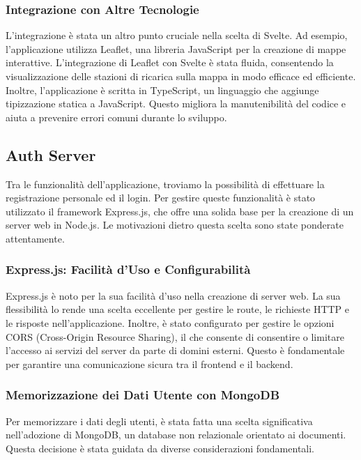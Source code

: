 \subsubsection{Integrazione con Altre Tecnologie}

L'integrazione è stata un altro punto cruciale nella scelta di Svelte. Ad esempio, l'applicazione utilizza Leaflet, una libreria JavaScript per la creazione di mappe interattive. L'integrazione di Leaflet con Svelte è stata fluida, consentendo la visualizzazione delle stazioni di ricarica sulla mappa in modo efficace ed efficiente. Inoltre, l'applicazione è scritta in TypeScript, un linguaggio che aggiunge tipizzazione statica a JavaScript. Questo migliora la manutenibilità del codice e aiuta a prevenire errori comuni durante lo sviluppo.

\subsection{Auth Server}

Tra le funzionalità dell'applicazione, troviamo la possibilità di effettuare la registrazione personale ed il login. Per gestire queste funzionalità è stato utilizzato il framework Express.js, che offre una solida base per la creazione di un server web in Node.js. Le motivazioni dietro questa scelta sono state ponderate attentamente.

\subsubsection{Express.js: Facilità d'Uso e Configurabilità}

Express.js è noto per la sua facilità d'uso nella creazione di server web. La sua flessibilità lo rende una scelta eccellente per gestire le route, le richieste HTTP e le risposte nell'applicazione. Inoltre, è stato configurato per gestire le opzioni CORS (Cross-Origin Resource Sharing), il che consente di consentire o limitare l'accesso ai servizi del server da parte di domini esterni. Questo è fondamentale per garantire una comunicazione sicura tra il frontend e il backend.

\subsubsection{Memorizzazione dei Dati Utente con MongoDB}

Per memorizzare i dati degli utenti, è stata fatta una scelta significativa nell'adozione di MongoDB, un database non relazionale orientato ai documenti. Questa decisione è stata guidata da diverse considerazioni fondamentali.

